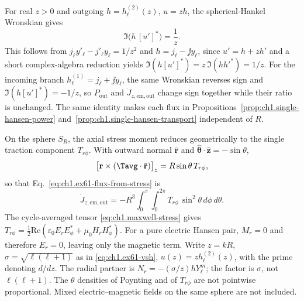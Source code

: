 For real $z>0$ and outgoing $h=h_\ell^{(2)}(z)$, $u=zh$, the spherical-Hankel Wronskian gives
\begin{equation}
\label{eq:ch1.ex61-hankel-wronskian}
\Im\bigl(h\,[u']^*\bigr)=\frac{1}{z}.
\end{equation}
This follows from $j_\ell y'_\ell-j'_\ell y_\ell=1/z^2$ and $h=j_\ell-\jj y_\ell$, since $u'=h+zh'$ and a short complex-algebra reduction yields $\Im(h[u']^*)=z\,\Im(hh'^*)=1/z$. For the incoming branch $h_\ell^{(1)}=j_\ell+\jj y_\ell$, the same Wronskian reverses sign and $\Im(h[u']^*)=-1/z$, so $P_{\mathrm{out}}$ and $\dot J_{z,\mathrm{em,out}}$ change sign together while their ratio is unchanged. The same identity makes each flux in Propositions~\ref{prop:ch1.single-hansen-power} and~\ref{prop:ch1.single-hansen-transport} independent of $R$.

On the sphere $S_R$, the axial stress moment reduces geometrically to the single traction component $T_{r\phi}$. With outward normal $\hat{\mathbf{r}}$ and $\hat{\boldsymbol{\theta}}\cdot\hat{\mathbf{z}}=-\sin\theta$,
\[
\bigl[\mathbf{r}\times(\Tavg\cdot\hat{\mathbf{r}})\bigr]_z=R\sin\theta\,T_{r\phi},
\]
so that Eq.~\eqref{eq:ch1.ex61-flux-from-stress} is
\[
\dot J_{z,\mathrm{em,out}}=-R^3\int_0^{\pi}\int_0^{2\pi}T_{r\phi}\,\sin^2\theta\,d\phi\,d\theta.
\]
The cycle-averaged tensor \eqref{eq:ch1.maxwell-stress} gives $T_{r\phi}=\tfrac12\mathrm{Re}(\varepsilon_0 E_r E_\phi^*+\mu_0 H_r H_\phi^*)$. For a pure electric Hansen pair, $M_r=0$ and therefore $E_r=0$, leaving only the magnetic term. Write $z=kR$, $\sigma=\sqrt{\ell(\ell+1)}$ as in \eqref{eq:ch1.ex61-vsh}, $u(z)=z h_\ell^{(2)}(z)$, with the prime denoting $d/dz$. The radial partner is $N_r=-(\sigma/z)h Y_\ell^m$; the factor is $\sigma$, not $\ell(\ell+1)$. The $\theta$ densities of Poynting and of $T_{r\phi}$ are not pointwise proportional. Mixed electric--magnetic fields on the same sphere are not included.

